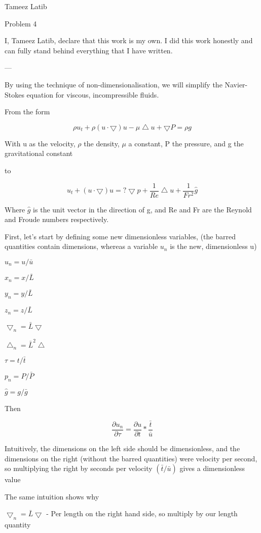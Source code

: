 \documentclass{article}
\begin{document}
Tameez Latib

Problem 4

I, Tameez Latib, declare that this work is my own. I did this work honestly and can fully stand behind everything that I have written.

---

By using the technique of non-dimensionalisation, we will simplify the Navier-Stokes equation for viscous, incompressible fluids.

From the form 

$$\rho u_t + \rho (u \cdot \bigtriangledown ) u - \mu \bigtriangleup u + \bigtriangledown P = \rho g$$

With u as the velocity, $\rho$ the density, $\mu$ a constant, P the pressure, and g the gravitational constant

to 

$$u_t + (u \cdot \bigtriangledown)u = ? \bigtriangledown p + \frac{1}{Re} \bigtriangleup u + \frac{1}{Fr^2} \hat{g} $$

Where $\hat{g}$ is the unit vector in the direction of g, and Re and Fr are the Reynold and Froude numbers respectively.

First, let's start by defining some new dimensionless variables, (the barred quantities contain dimensions, whereas a variable $u_n$ is the new, dimensionless u)

$u_n = u / \bar{u}$

$x_n = x / \bar{L}$

$y_n = y / \bar{L}$

$z_n = z / \bar{L}$

$ \bigtriangledown_n = \bar{L}  \bigtriangledown$

$ \bigtriangleup_n = \bar{L}^2  \bigtriangleup$

$\tau = t / \bar{t}$

$p_n = P / \bar{P}$

$\hat{g} = g / \bar{g} $

Then 

$$ \frac{\partial u_n}{\partial \tau} = \frac{\partial u}{\partial t} * \frac{\bar{t}}{\bar{u}}$$

Intuitively, the dimensions on the left side should be dimensionless, and the dimensions on the right (without the barred quantities) were velocity per second, so multiplying the right by seconds per velocity $({\bar{t}}/{\bar{u}})$ gives a dimensionless value

The same intuition shows why

$ \bigtriangledown_n = \bar{L}  \bigtriangledown$ - Per length on the right hand side, so multiply by our length quantity
\end{document}
